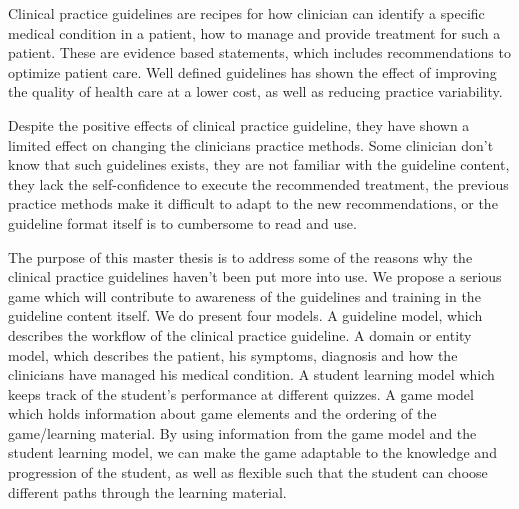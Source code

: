  Clinical practice guidelines are recipes for how clinician can identify a specific medical condition in a patient, how to manage and provide treatment for such a patient. These are evidence based statements, which includes recommendations to optimize patient care. Well defined guidelines has shown the effect of improving the quality of health care at a lower cost, as well as reducing practice variability.
 
 Despite the positive effects of clinical practice guideline, they have shown a limited effect on changing the clinicians practice methods. Some clinician don't know that such guidelines exists, they are not familiar with the guideline content, they lack the self-confidence to execute the recommended treatment, the previous practice methods make it difficult to adapt to the new recommendations, or the guideline format itself is to cumbersome to read and use.
 
 The purpose of this master thesis is to address some of the reasons why the clinical practice guidelines haven't been put more into use. We propose a serious game which will contribute to awareness of the guidelines and training in the guideline content itself. We do present four models. A guideline model, which describes the workflow of the clinical practice guideline. A domain or entity model, which describes the patient, his symptoms, diagnosis and how the clinicians have managed his medical condition. A student learning model which keeps track of the student's performance at different quizzes. A game model which holds information about game elements and the ordering of the game/learning material. By using information from the game model and the student learning model, we can make the game adaptable to the knowledge and progression of the student, as well as flexible such that the student can choose different paths through the learning material.